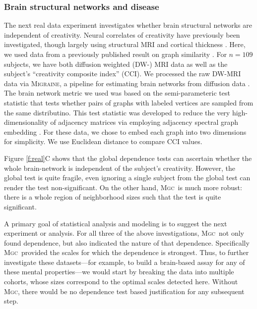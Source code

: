 \documentclass[11pt]{article}
\providecommand{\sct}[1]{{\normalfont\textsc{#1}}}
\newcommand{\Migraine}{\sct{Migraine}}
\newcommand{\Mgc}{\sct{Mgc}}
\begin{document}
\subsubsection*{Brain structural networks and disease}

The next real data experiment investigates whether brain structural networks are independent of creativity.  Neural correlates of creativity have previously been investigated, though largely using structural MRI and cortical thickness \cite{Jung2009}.  Here, we used data from a previously published result on graph similarity \cite{Koutra15a}. For  $n=109$ subjects, we have both diffusion weighted (DW-) MRI data as well as the subject's ``creativity composite index'' (CCI).  We processed the raw DW-MRI data via \Migraine, a pipeline for estimating brain networks from diffusion data \cite{Migraine}.   
The brain network metric we used was based on  the semi-parameteric test statistic \cite{Tang2016} that tests whether pairs of graphs with labeled vertices are sampled from the same distributino.  This test statistic was developed to reduce  the very high-dimensionality of adjacency matrices via employing adjacency spectral graph embedding  \cite{Sussman2013}. For these data, we chose to embed each graph into two dimensions for simplicity. We use Euclidean distance to compare CCI values. 



Figure \ref{f:real}C shows that the global dependence tests can ascertain whether the whole brain-network is independent of the subject's creativity.  However, the global test is quite fragile, even ignoring a single subject from the global test can render the test non-significant. On the other hand, \Mgc~is much more robust: there is a whole region of neighborhood sizes such that the test is quite significant.  



A primary goal of statistical analysis and modeling is to suggest the next experiment or analysis.  For all three of the above investigations, \Mgc~not only found dependence, but also indicated the nature of that dependence.  Specifically \Mgc~provided the scales for which the dependence is strongest.  Thus, to further investigate these datasets---for example, to build a brain-based assay for any of these mental properties---we would start by breaking the data into multiple cohorts, whose sizes correspond to the optimal scales detected here.  Without \Mgc, there would be no dependence test based justification for any subsequent step.
\end{document}
